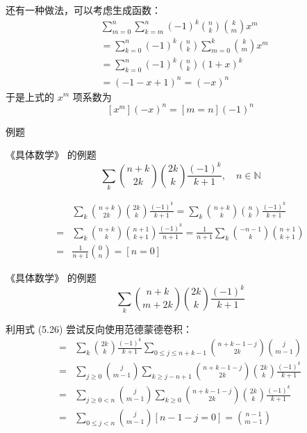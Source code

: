 \documentclass[UTF8]{beamer}
\begin{document}
    \begin{frame}
        还有一种做法，可以考虑生成函数：
        \pause
        \begin{align*}
            & \sum_{m=0}^{n}\sum_{k=m}^n(-1)^{k}\binom nk\binom kmx^m\\
            & =\sum_{k=0}^{n}(-1)^{k}\binom nk\sum_{m=0}^k\binom kmx^m\\
            & =\sum_{k=0}^{n}(-1)^{k}\binom nk(1+x)^k\\
            & =(-1-x+1)^n=(-x)^n
        \end{align*}
        \pause
        于是上式的 $x^m$ 项系数为
        $$
        [x^m](-x)^n=[m=n](-1)^n
        $$
    \end{frame}

    \begin{frame}{例题}
        \begin{block}{《具体数学》 的例题}
            $$\sum_k\binom{n+k}{2k}\binom{2k}{k}\frac{(-1)^k}{k+1},\quad n\in \mathbb N$$
        \end{block}
        \pause
        \begin{align*}
              & \sum_k\binom{n+k}{2k}\binom{2k}{k}\frac{(-1)^k}{k+1}=\sum_k\binom{n+k}{k}\binom{n}{k}\frac{(-1)^k}{k+1}\\
            = & \sum_k\binom{n+k}{k}\binom{n+1}{k+1}\frac{(-1)^k}{n+1}=\frac{1}{n+1}\sum_k\binom{-n-1}{k}\binom{n+1}{k+1}\\
            = & \frac 1{n+1}\binom 0n=[n=0]
        \end{align*}
    \end{frame}

    \begin{frame}
        \begin{block}{《具体数学》 的例题}
            $$\sum_k\binom{n+k}{m+2k}\binom{2k}{k}\frac{(-1)^k}{k+1}$$
        \end{block}
        \pause
        利用式 (5.26) 尝试反向使用范德蒙德卷积：
        \begin{align*}
            = & \sum_k\binom{2k}{k}\frac{(-1)^k}{k+1}\sum_{0\leq j\leq n+k-1}\binom{n+k-1-j}{2k}\binom{j}{m-1}\\
            = & \sum_{j\ge 0}\binom{j}{m-1}\sum_{k\ge j-n+1}\binom{n+k-1-j}{2k}\binom{2k}{k}\frac{(-1)^k}{k+1}\\
            = & \sum_{j\ge 0<n}\binom{j}{m-1}\sum_{k\ge 0}\binom{n+k-1-j}{2k}\binom{2k}{k}\frac{(-1)^k}{k+1}\\
            = & \sum_{0\le j<n}\binom{j}{m-1}[n-1-j=0]
            = \binom{n-1}{m-1}
        \end{align*}
    \end{frame}
    
\end{document}
